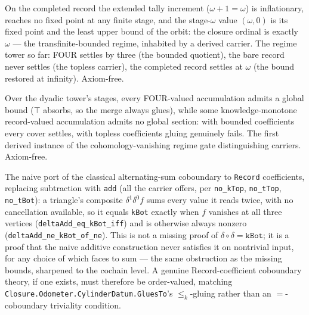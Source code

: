 \begin{theorem}\label{thm:settles-at-omega}\leanok{}
On the completed record the extended tally increment ($\omega + 1 = \omega$)
is inflationary, reaches no fixed point at any finite stage, and the
stage-$\omega$ value $(\omega, 0)$ is its fixed point and the least upper
bound of the orbit: the closure ordinal is exactly $\omega$ --- the
transfinite-bounded regime, inhabited by a derived carrier. The regime tower
so far: FOUR settles by three (the bounded quotient), the bare record never
settles (the topless carrier), the completed record settles at $\omega$ (the
bound restored at infinity). Axiom-free.
\end{theorem}

\begin{theorem}\label{thm:tower-gluing-dichotomy}\leanok{}
Over the dyadic tower's stages, every FOUR-valued accumulation admits a
global bound ($\top$ absorbs, so the merge always glues), while some
knowledge-monotone record-valued accumulation admits no global section:
with bounded coefficients every cover settles, with topless coefficients
gluing genuinely fails. The first derived instance of the
cohomology-vanishing regime gate distinguishing carriers. Axiom-free.
\end{theorem}

\begin{theorem}\label{thm:record-additive-coboundary-fails}\leanok{}
The naive port of the classical alternating-sum coboundary to \texttt{Record} coefficients,
replacing subtraction with \texttt{add} (all the carrier offers, per \texttt{no\_kTop},
\texttt{no\_tTop}, \texttt{no\_tBot}): a triangle's composite \(\delta^1\delta^0 f\) sums every
value it reads twice, with no cancellation available, so it equals \texttt{kBot} exactly when
\(f\) vanishes at all three vertices (\texttt{deltaAdd\_eq\_kBot\_iff}) and is otherwise always
nonzero (\texttt{deltaAdd\_ne\_kBot\_of\_ne}). This is not a missing proof of
\(\delta\circ\delta=\texttt{kBot}\); it is a proof that the naive additive construction never
satisfies it on nontrivial input, for any choice of which faces to sum --- the same obstruction as
the missing bounds, sharpened to the cochain level. A genuine Record-coefficient coboundary
theory, if one exists, must therefore be order-valued, matching
\texttt{Closure.Odometer.CylinderDatum.GluesTo}'s \(\le_k\)-gluing rather than an
\(=\)-coboundary triviality condition.
\end{theorem}

